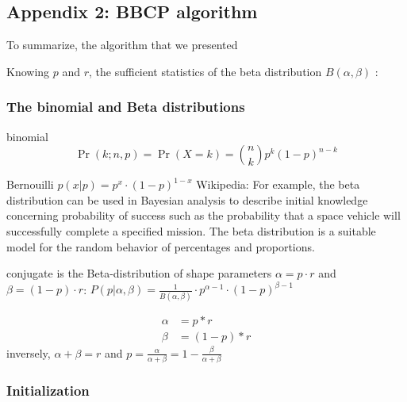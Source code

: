 \documentclass[12pt,english]{article}%
\newcommand{\eq}[1]{\begin{equation*}#1\end{equation*}}
\newcommand{\eqs}[1]{\begin{align*}#1\end{align*}}
\begin{document}
\subsection{Appendix 2: BBCP algorithm}
\label{app:bcp}


To summarize, the algorithm that we presented 
%
%
%
%

Knowing $p$ and $r$, the sufficient statistics of the beta distribution $B(\alpha, \beta)$ :


\subsubsection{The binomial and Beta distributions}

binomial
\eq{
\Pr(k;n,p) = \Pr(X = k) = {n\choose k}p^k(1-p)^{n-k}
}


Bernouilli $p(x | p) = p^x \cdot (1-p)^{1-x}$
Wikipedia: For example, the beta distribution can be used in Bayesian analysis to describe initial knowledge concerning probability of success such as the probability that a space vehicle will successfully complete a specified mission. The beta distribution is a suitable model for the random behavior of percentages and proportions. 

conjugate is the Beta-distribution of shape parameters $\alpha = p\cdot r$ and $\beta = (1- p)\cdot r$:
$ P(p | \alpha, \beta ) = \frac{1}{B(\alpha, \beta)} \cdot p^{\alpha -1} \cdot (1-p)^{\beta - 1} $

\eqs{
        \alpha &= p*r \\
        \beta  &= (1-p)*r
    }
inversely, $\alpha + \beta = r$ and $p = \frac{\alpha}{\alpha +\beta} = 1- \frac{\beta}{\alpha + \beta}$



\subsubsection{Initialization}
\end{document}

